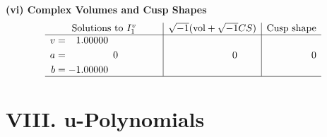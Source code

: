 \documentclass[1p]{elsarticle_modified}
\theoremstyle{definition}
\newcommand{\I}{\sqrt{-1}}
\begin{document}
\newpage\flushleft \textbf{(vi) Complex Volumes and Cusp Shapes}
$$\begin{array}{c|c|c}  
\text{Solutions to }I^v_{1}& \I (\text{vol} + \sqrt{-1}CS) & \text{Cusp shape}\\
 \hline 
\begin{aligned}
v &= \phantom{-}1.00000\phantom{ +0.000000I} \\
a &= \phantom{-0.000000 } 0 \\
b &= -1.00000\phantom{ +0.000000I}\end{aligned}
 & \phantom{-0.000000 } 0 & \phantom{-0.000000 } 0\\
 \hline 
 \end{array}$$\newpage
\newpage\renewcommand{\arraystretch}{1}
\centering \section*{ VIII. u-Polynomials}
\end{document}
